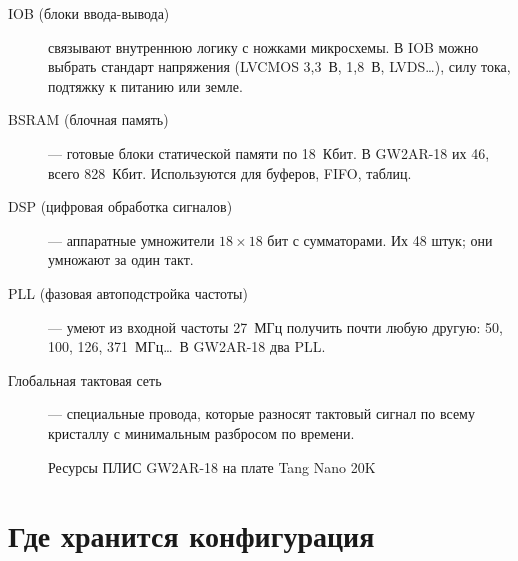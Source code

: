 \begin{description}
  \item[IOB (блоки ввода-вывода)] связывают внутреннюю логику с ножками
    микросхемы. В IOB можно выбрать стандарт напряжения (LVCMOS 3,3~В,
    1,8~В, LVDS\ldots), силу тока, подтяжку к питанию или земле.
  \item[BSRAM (блочная память)] --- готовые блоки статической памяти по 18~Кбит.
    В GW2AR-18 их 46, всего 828~Кбит. Используются для буферов, FIFO, таблиц.
  \item[DSP (цифровая обработка сигналов)] --- аппаратные умножители
    $18\times18$ бит с сумматорами. Их 48 штук; они умножают за один такт.
  \item[PLL (фазовая автоподстройка частоты)] --- умеют из входной частоты
    27~МГц получить почти любую другую: 50, 100, 126, 371~МГц\ldots\
    В GW2AR-18 два PLL.
  \item[Глобальная тактовая сеть] --- специальные провода, которые разносят
    тактовый сигнал по всему кристаллу с минимальным разбросом по времени.
\end{description}

\begin{figure}[H]
\centering
{}
\caption{Ресурсы ПЛИС GW2AR-18 на плате Tang Nano 20K}
\end{figure}

\section{Где хранится конфигурация}

